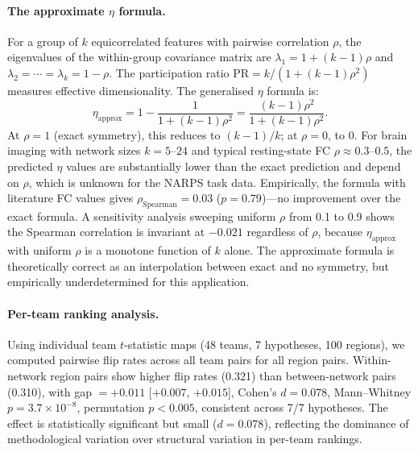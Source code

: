 \documentclass[11pt,a4paper]{article}
\begin{document}
\paragraph{The approximate $\eta$ formula.}
For a group of $k$ equicorrelated features with pairwise correlation $\rho$, the eigenvalues of the within-group covariance matrix are $\lambda_1 = 1 + (k-1)\rho$ and $\lambda_2 = \cdots = \lambda_k = 1 - \rho$.  The participation ratio $\mathrm{PR} = k / (1 + (k-1)\rho^2)$ measures effective dimensionality.  The generalised $\eta$ formula is:
\[
\eta_{\mathrm{approx}} = 1 - \frac{1}{1 + (k-1)\rho^2} = \frac{(k-1)\rho^2}{1 + (k-1)\rho^2}.
\]
At $\rho = 1$ (exact symmetry), this reduces to $(k-1)/k$; at $\rho = 0$, to $0$.  For brain imaging with network sizes $k = 5$--$24$ and typical resting-state FC $\rho \approx 0.3$--$0.5$, the predicted $\eta$ values are substantially lower than the exact prediction and depend on $\rho$, which is unknown for the NARPS task data.  Empirically, the formula with literature FC values gives $\rho_{\mathrm{Spearman}} = 0.03$ ($p = 0.79$)---no improvement over the exact formula.  A sensitivity analysis sweeping uniform $\rho$ from 0.1 to 0.9 shows the Spearman correlation is invariant at $-0.021$ regardless of $\rho$, because $\eta_{\mathrm{approx}}$ with uniform $\rho$ is a monotone function of $k$ alone.  The approximate formula is theoretically correct as an interpolation between exact and no symmetry, but empirically underdetermined for this application.

\paragraph{Per-team ranking analysis.}
Using individual team $t$-statistic maps (48 teams, 7 hypotheses, 100 regions), we computed pairwise flip rates across all team pairs for all region pairs.  Within-network region pairs show higher flip rates (0.321) than between-network pairs (0.310), with gap $= +0.011$ [$+0.007$, $+0.015$], Cohen's $d = 0.078$, Mann--Whitney $p = 3.7 \times 10^{-8}$, permutation $p < 0.005$, consistent across 7/7 hypotheses.  The effect is statistically significant but small ($d = 0.078$), reflecting the dominance of methodological variation over structural variation in per-team rankings.
\end{document}
